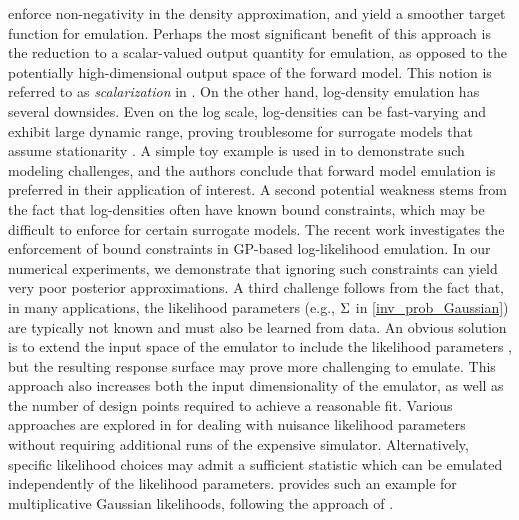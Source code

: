 \documentclass[12pt]{article}
\begin{document}
enforce non-negativity in the density approximation, and yield a smoother target function for emulation.
Perhaps the most significant benefit of this approach is the reduction to a scalar-valued output quantity for emulation,
as opposed to the potentially high-dimensional output space of the forward model. This notion is referred 
to as \textit{scalarization} in \citet{ranjan2016inverse, trainDynamics}.
On the other hand, log-density emulation has several downsides. Even on the log scale, log-densities can be fast-varying and 
exhibit large dynamic range, proving troublesome for surrogate models that assume stationarity \cite{wang2018adaptive}.
A simple toy example is used in \citep{Surer2023sequential} to demonstrate such modeling challenges, and the 
authors conclude that forward model emulation is preferred in their application of interest. A second potential weakness 
stems from the fact that log-densities often have known bound constraints, which may be difficult to enforce 
for certain surrogate models. The recent work \citet{quantileApprox} investigates the enforcement of 
bound constraints in GP-based log-likelihood emulation. In our numerical experiments, we demonstrate that ignoring
such constraints can yield very poor posterior approximations. A third challenge follows from the fact that, in many applications, 
the likelihood parameters (e.g., $\Sigma$ in \cref{inv_prob_Gaussian}) are typically not known and must also be 
learned from data. An obvious solution is to extend the input space of the emulator to include the likelihood parameters
\citep{llikRBF,emPostDens}, but the resulting response surface may prove more challenging to emulate. This approach also increases both the 
input dimensionality of the emulator, as well as the number of design points required to achieve 
a reasonable fit. Various approaches are explored in \citet{llikRBF} for dealing with nuisance likelihood parameters
without requiring additional runs of the expensive simulator. Alternatively, specific likelihood 
choices may admit a sufficient statistic which can be emulated independently of the likelihood parameters. 
 provides such an example for multiplicative Gaussian likelihoods, following the 
approach of \citet{FerEmulation}.
\end{document}
